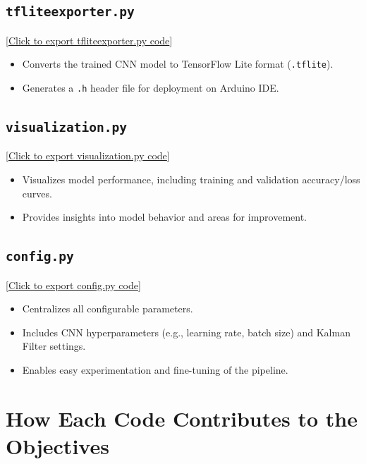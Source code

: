 \subsection{\texttt{tfliteexporter.py}}
[\href{run:../Code/MicroPython/project code/src/tfliteexporter.py}{Click to export tfliteexporter.py code}] 
\begin{itemize}
    \item Converts the trained CNN model to TensorFlow Lite format (\texttt{.tflite}).
    \item Generates a \texttt{.h} header file for deployment on Arduino IDE.
\end{itemize}

\subsection{\texttt{visualization.py}}
[\href{run:../Code/MicroPython/project code/src/visualization.py}{Click to export visualization.py code}] 
\begin{itemize}
    \item Visualizes model performance, including training and validation accuracy/loss curves.
    \item Provides insights into model behavior and areas for improvement.
\end{itemize}

\subsection{\texttt{config.py}}
[\href{run:../Code/MicroPython/project code/src/config.py}{Click to export config.py code}] 
\begin{itemize}
    \item Centralizes all configurable parameters.
    \item Includes CNN hyperparameters (e.g., learning rate, batch size) and Kalman Filter settings.
    \item Enables easy experimentation and fine-tuning of the pipeline.
\end{itemize}

\section{How Each Code Contributes to the Objectives}

